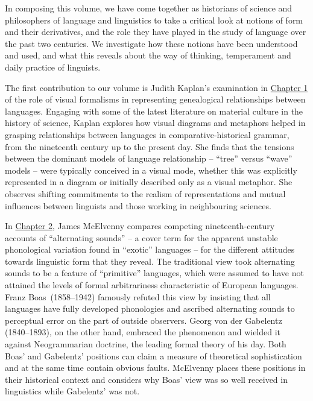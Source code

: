 \documentclass[output=paper]{langscibook}
\begin{document}
In composing this volume, we have come together as historians of science and philosophers of language and linguistics to take a critical look at notions of form and their derivatives, and the role they have played in the study of language over the past two centuries. We investigate how these notions have been understood and used, and what this reveals about the way of thinking, temperament and daily practice of linguists.

The first contribution to our volume is Judith Kaplan's examination in \hyperref[chap:kaplan]{Chapter 1} of the role of visual formalisms in representing genealogical relationships between languages. Engaging with some of the latest literature on material culture in the history of science, Kaplan explores how visual diagrams and metaphors helped in grasping relationships between languages in comparative-historical grammar, from the nineteenth century up to the present day. She finds that the tensions between the dominant models of language relationship -- ``tree'' versus ``wave'' models -- were typically conceived in a visual mode, whether this was explicitly represented in a diagram or initially described only as a visual metaphor. She observes shifting commitments to the realism of representations and mutual influences between linguists and those working in neighbouring sciences.

In \hyperref[chap:mcelvenny]{Chapter 2}, James McElvenny compares competing nineteenth-century accounts of ``alternating sounds'' -- a cover term for the apparent unstable phonological variation found in ``exotic'' languages -- for the different attitudes towards linguistic form that they reveal. The traditional view took alternating sounds to be a feature of ``primitive'' languages, which were assumed to have not attained the levels of formal arbitrariness characteristic of European languages. Franz Boas~(1858--1942) famously refuted this view by insisting that all languages have fully developed phonologies and ascribed alternating sounds to perceptual error on the part of outside observers. Georg von der Gabelentz (1840--1893), on the other hand, embraced the phenomenon and wielded it against Neogrammarian doctrine, the leading formal theory of his day. Both Boas' and Gabelentz' positions can claim a measure of theoretical sophistication and at the same time contain obvious faults. McElvenny places these positions in their historical context and considers why Boas' view was so well received in linguistics while Gabelentz' was not.
\end{document}
